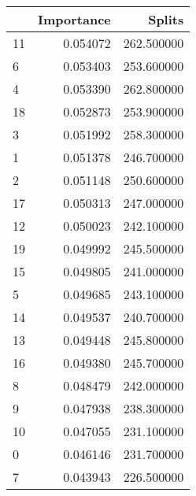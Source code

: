 \begin{tabular}{lrr}
\toprule
 & Importance & Splits \\
\midrule
11 & 0.054072 & 262.500000 \\
6 & 0.053403 & 253.600000 \\
4 & 0.053390 & 262.800000 \\
18 & 0.052873 & 253.900000 \\
3 & 0.051992 & 258.300000 \\
1 & 0.051378 & 246.700000 \\
2 & 0.051148 & 250.600000 \\
17 & 0.050313 & 247.000000 \\
12 & 0.050023 & 242.100000 \\
19 & 0.049992 & 245.500000 \\
15 & 0.049805 & 241.000000 \\
5 & 0.049685 & 243.100000 \\
14 & 0.049537 & 240.700000 \\
13 & 0.049448 & 245.800000 \\
16 & 0.049380 & 245.700000 \\
8 & 0.048479 & 242.000000 \\
9 & 0.047938 & 238.300000 \\
10 & 0.047055 & 231.100000 \\
0 & 0.046146 & 231.700000 \\
7 & 0.043943 & 226.500000 \\
\bottomrule
\end{tabular}
